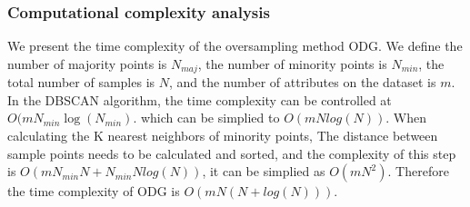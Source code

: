 \documentclass[runningheads]{llncs}
\begin{document}
\subsubsection{Computational complexity analysis}
We present the time complexity of the oversampling method ODG.
We define the number of majority points is $N_{maj}$, 
the number of minority points is $N_{min}$, the total number of samples is $N$, 
and the number of attributes on the dataset is $m$.
In the DBSCAN algorithm, the time complexity can be controlled at $O(mN_{min}\log(N_{min})$.
which can be simplied to $O(mNlog(N))$.
When calculating the K nearest neighbors of minority points,
The distance between sample points needs to be calculated and sorted, and the complexity of this step is
$O(mN_{min}N+N_{min}Nlog(N))$, it can be simplied as $O(mN^2)$. Therefore the time complexity of
ODG is $O(mN(N+log(N)))$.
\end{document}
